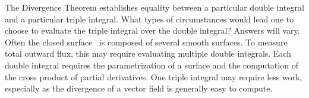 {The Divergence Theorem establishes equality between a particular double integral and a particular triple integral. What types of circumstances would lead one to choose to evaluate the triple integral over the double integral? 
}
{Answers will vary. Often the closed surface \surfaceS\ is composed of several smooth surfaces. To measure total outward flux, this may require evaluating multiple double integrals. Each double integral requires the parametrization of a surface and the computation of the cross product of partial derivatives. One triple integral may require less work, especially as the divergence of a vector field is generally easy to compute.
}
